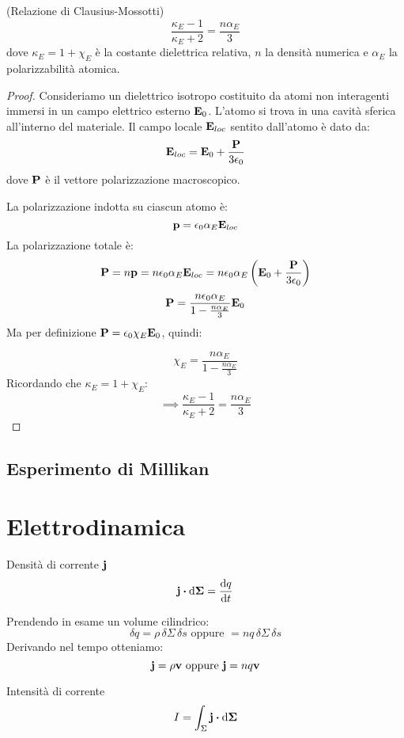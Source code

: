 \documentclass[12pt,a4paper]{article}
\begin{document}
\begin{proposition}
(Relazione di Clausius-Mossotti)
\[
\frac{\kappa_E - 1}{\kappa_E + 2} = \frac{n \alpha_E}{3}
\]
dove $\kappa_E = 1 + \chi_E$ è la costante dielettrica relativa, $n$ la densità numerica e $\alpha_E$ la polarizzabilità atomica.
\end{proposition}
\begin{proof}
Consideriamo un dielettrico isotropo costituito da atomi non interagenti immersi in un campo elettrico esterno $\vb{E}_0$. 
L'atomo si trova in una cavità sferica all'interno del materiale. Il campo locale $\vb{E}_{loc}$ sentito dall'atomo è dato da:
\[
\vb{E}_{loc} = \vb{E}_0 + \frac{\vb{P}}{3\epsilon_0}
\]
dove $\vb{P}$ è il vettore polarizzazione macroscopico.

La polarizzazione indotta su ciascun atomo è:
\[
\vb{p} = \epsilon_0 \alpha_E \vb{E}_{loc}
\]
La polarizzazione totale è:
\[
\vb{P} = n \vb{p} = n \epsilon_0 \alpha_E \vb{E}_{loc}
= n \epsilon_0 \alpha_E \left( \vb{E}_0 + \frac{\vb{P}}{3\epsilon_0} \right)
\]
\[
\vb{P} = \frac{n \epsilon_0 \alpha_E}{1 - \frac{n \alpha_E}{3}} \vb{E}_0
\]
Ma per definizione $\vb{P} = \epsilon_0 \chi_E \vb{E}_0$, quindi:

\[
\chi_E = \frac{n \alpha_E}{1 - \frac{n \alpha_E}{3}}
\]
Ricordando che $\kappa_E = 1 + \chi_E$:
\[
\implies \frac{\kappa_E - 1}{\kappa_E + 2} = \frac{n \alpha_E}{3}
\]
\end{proof}


\subsection{Esperimento di Millikan}






\section{Elettrodinamica}

\begin{definition}
    Densità di corrente $\vb{j}$
    \begin{equation*}
        \vb{j}\vdot\dd{\vb{\Sigma}}= \dv{q}{t}
    \end{equation*}
\end{definition}
Prendendo in esame un volume cilindrico:
\begin{equation*}
    \delta q = \rho\,\delta\Sigma\,\delta s \text{  oppure  } =  n q \,\delta\Sigma\,\delta s
\end{equation*}
Derivando nel tempo otteniamo:
\begin{equation*}
    \vb{j}= \rho\vb{v} \text{  oppure  } \vb{j}= nq\vb{v}
\end{equation*}
\begin{definition}
    Intensità di corrente
    \begin{equation*}
        I = \int_\Sigma \vb{j}\vdot\dd{\vb{\Sigma}}
    \end{equation*}
\end{definition}
\end{document}
